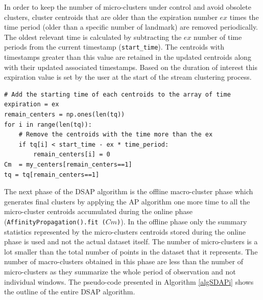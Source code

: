 In order to keep the number of micro-clusters under control and avoid obsolete clusters, cluster centroids that are older than the expiration number $ex$ times the time period (older than a specific number of landmark) are removed periodically. The oldest relevant time is calculated by subtracting the $ex$ number of time periods from the current timestamp (\texttt{start\_time}). The centroids with timestamps greater than this value are retained in the updated centroids along with their updated associated timestamps. Based on the duration of interest this expiration value is set by the user at the start of the stream clustering process. 



\begin{lstlisting}
# Add the starting time of each centroids to the array of time
expiration = ex
remain_centers = np.ones(len(tq))
for i in range(len(tq)):
    # Remove the centroids with the time more than the ex
    if tq[i] < start_time - ex * time_period:
        remain_centers[i] = 0
Cm  = my_centers[remain_centers==1]
tq = tq[remain_centers==1]
\end{lstlisting}




The next phase of the DSAP algorithm is the offline macro-cluster phase which generates final clusters by applying the AP algorithm one more time to all the micro-cluster centroids accumulated during the online phase (\texttt{AffinityPropagation().fit ($Cm$)}). In the offline phase only the summary statistics represented by the micro-clusters centroids stored during the online phase is used and not the actual dataset itself. The number of micro-clusters is a lot smaller than the total number of points in the dataset that it represents. The number of macro-clusters obtained in this phase are less than the number of micro-clusters as they summarize the whole period of observation and not individual windows. The pseudo-code presented in Algorithm \ref{algSDAPi} shows the outline of the entire DSAP algorithm. 



